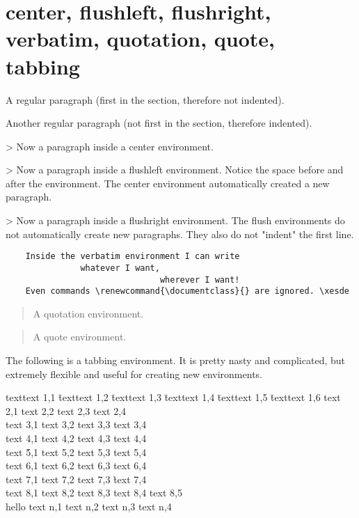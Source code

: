 \documentclass[environments-demo.tex]{subfiles}
\begin{document}
\section{center, flushleft, flushright, verbatim, quotation, quote, tabbing}

A regular paragraph
(first in the section, therefore not indented).
\blindtext

Another regular paragraph
(not first in the section, therefore indented).
\blindtext

\begin{center}
> Now a paragraph inside a center environment.
\blindtext

\blindtext
\end{center}
\begin{flushleft}
> Now a paragraph inside a flushleft environment.
Notice the space before and after the environment.
The center environment automatically created a new paragraph.
\blindtext
\end{flushleft}

\begin{flushright}
> Now a paragraph inside a flushright environment.
The flush environments do not automatically create new paragraphs. They also do not "indent" the first line.
\blindtext
\end{flushright}

\begin{verbatim}
    Inside the verbatim environment I can write
               whatever I want,
                               wherever I want!
    Even commands \renewcommand{\documentclass}{} are ignored. \xesde
\end{verbatim}

\begin{quotation}
A quotation environment.
\blindtext
\end{quotation}

\begin{quote}
A quote environment.
\blindtext
\end{quote}

The following is a tabbing environment. It is pretty nasty and complicated,
but extremely flexible and useful for creating new environments.

\begin{tabbing}
texttext 1,1 \= texttext 1,2 \= texttext 1,3 \= texttext 1,4 \= texttext 1,5 \= texttext 1,6 \kill
text 2,1 \> text 2,2 \> text 2,3 \> text 2,4 \+\\
text 3,1 \> text 3,2 \> text 3,3 \> text 3,4 \-\\
text 4,1 \> text 4,2 \> text 4,3 \> text 4,4 \+\+\\
text \' 5,1 \> text 5,2 \> text 5,3 \> text 5,4 \-\\
text 6,1 \> text 6,2 \> text 6,3 \> text 6,4 \-\\
text 7,1 \> text 7,2 \> text 7,3 \` text 7,4 \\
text 8,1 \> text 8,2 \> text 8,3 \> text 8,4 \> text 8,5 \+\+\\
\< hello \> text n,1 \> text n,2 \> text n,3 \> text n,4 %
\end{tabbing}
\end{document}

